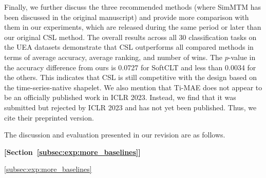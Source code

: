 \begin{sloppypar}
Finally, we further discuss the three recommended methods (where SimMTM has been discussed in the original manuscript) and provide more comparison with them in our experiments, which are released during the same period or later than our original CSL method. The overall results across all 30 classification tasks on the UEA datasets demonstrate that CSL outperforms all compared methods in terms of average accuracy, average ranking, and number of wins. The $p$-value in the accuracy difference from ours is 0.0727 for SoftCLT and less than 0.0034 for the others. This indicates that CSL is still competitive with the design based on the time-series-native shapelet. We also mention that Ti-MAE does not appear to be an officially published work in ICLR 2023. Instead, we find that it was submitted but rejected by ICLR 2023 and has not yet been published. Thus, we cite their preprinted version. 

The discussion and evaluation presented in our revision are as follows.

\renewcommand{\thetable}{\ref{tab:more_baselines}}
\begin{table}[t]
    \centering
    \caption{}
    \vspace{-2ex}
    \vspace{-3ex}
\end{table}

\begin{framed}
\textbf{[Section~\ref{subsec:exp:more_baselines}]}

\noindent
\ref{subsec:exp:more_baselines} 


\end{framed}
\end{sloppypar}
